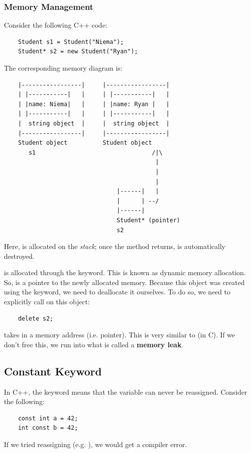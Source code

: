 \documentclass[letterpaper]{article}
\begin{document}
\subsubsection{Memory Management}
Consider the following C++ code: 
\begin{verbatim}
    Student s1 = Student("Niema");
    Student* s2 = new Student("Ryan");
\end{verbatim}
The corresponding memory diagram is: 
\begin{verbatim}
    |-----------------|     |-----------------|
    | |-----------|   |     | |-----------|   |
    | |name: Niema|   |     | |name: Ryan |   |
    | |-----------|   |     | |-----------|   |
    |  string object  |     |  string object  |
    |-----------------|     |-----------------|
    Student object          Student object 
       s1                                 /|\
                                           |
                                           |
                                           |
                                |------|   |
                                |      | --/
                                |------|
                                Student* (pointer)
                                s2
\end{verbatim}
Here,  is allocated on the \emph{stack}; once the method returns,  is automatically destroyed. 

\bigskip 

 is allocated through the  keyword. This is known as dynamic memory allocation. So,  is a pointer to the newly allocated memory. Because this object was created using the  keyword, we need to deallocate it ourselves. To do so, we need to explicitly call  on this object: 
\begin{verbatim}
    delete s2; 
\end{verbatim}
 takes in a memory address (i.e. pointer). This is very similar to  (in C). If we don't free this, we run into what is called a \textbf{memory leak}. 

\subsection{Constant Keyword}
In C++, the  keyword means that the variable can never be reassigned. Consider the following: 
\begin{verbatim}
    const int a = 42; 
    int const b = 42;
\end{verbatim}
If we tried reassigning  (e.g. ), we would get a compiler error. 
\end{document}
